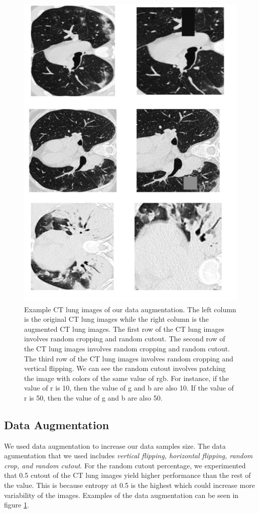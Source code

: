 \begin{figure}
	\centering
	\includegraphics[width=\linewidth]{data_aug.png}
	\caption{Example CT lung images of our data augmentation. The left column is the original CT lung images while the right column is the augmented CT lung images. The first row of the CT lung images involves random cropping and random cutout. The second row of the CT lung images involves random cropping and random cutout. The third row of the CT lung images involves random cropping and vertical flipping. We can see the random cutout involves patching the image with colors of the same value of rgb. For instance, if the value of r is 10, then the value of g and b are also 10. If the value of r is 50, then the value of g and b are also 50.}
	\label{fig:data_aug}
\end{figure}

\subsection{Data Augmentation}
We used data augmentation to increase our data samples size. The data agumentation that we used includes \textit{vertical flipping, horizontal flipping, random crop, and random cutout}. For the random cutout percentage, we experimented that 0.5 cutout of the CT lung images yield higher performance than the rest of the value. This is because entropy at 0.5 is the highest which could increase more variability of the images. Examples of the data augmentation can be seen in figure \ref{fig:data_aug}.

